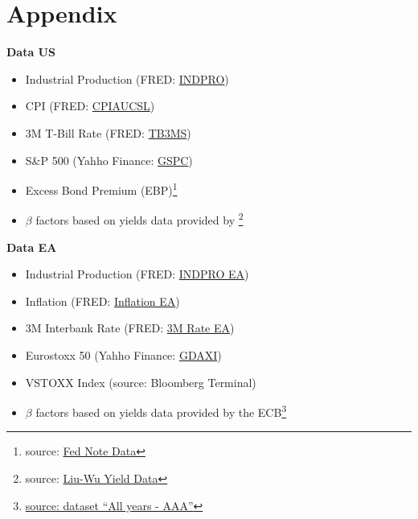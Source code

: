 \section{Appendix}
\label{sec:appendix}

\textbf{Data US}
\begin{itemize}

    \item Industrial Production (FRED: \href{https://fred.stlouisfed.org/series/INDPRO}{INDPRO}) 
    \item CPI (FRED: \href{https://fred.stlouisfed.org/series/CPIAUCSL}{CPIAUCSL})
    \item 3M T-Bill Rate (FRED: \href{https://fred.stlouisfed.org/series/TB3MS}{TB3MS})
    \item S\&P 500 (Yahho Finance: \href{https://finance.yahoo.com/quote/%5EGSPC?p=^GSPC&.tsrc=fin-srch}{GSPC})
    \item Excess Bond Premium (EBP)\footnote{source: \href{https://www.federalreserve.gov/econres/notes/feds-notes/ebp_csv.csv}{Fed Note Data}}
    \item $\beta$ factors based on yields data provided by \citet{liu2021reconstructing}\footnote{source: \href{https://sites.google.com/view/jingcynthiawu/yield-data}{Liu-Wu Yield Data}}
\end{itemize}



\textbf{Data EA}
\begin{itemize}

    \item Industrial Production (FRED: \href{https://fred.stlouisfed.org/series/EA19PRINTO01GYSAM}{INDPRO EA})
    \item Inflation (FRED: \href{https://fred.stlouisfed.org/series/CPHPTT01EZM659N}{Inflation EA})
    \item 3M Interbank Rate (FRED: \href{https://fred.stlouisfed.org/series/IR3TIB01EZM156N}{3M Rate EA})
    \item Eurostoxx 50 (Yahho Finance: \href{https://finance.yahoo.com/quote/%5EGDAXI?p=^GDAXI&.tsrc=fin-srch}{GDAXI})
    \item VSTOXX Index (source: Bloomberg Terminal)
    \item $\beta$ factors based on yields data provided by the ECB\footnote{\href{https://www.ecb.europa.eu/stats/financial_markets_and_interest_rates/euro_area_yield_curves/html/index.en.html}{source: dataset ``All years - AAA''}}
\end{itemize}